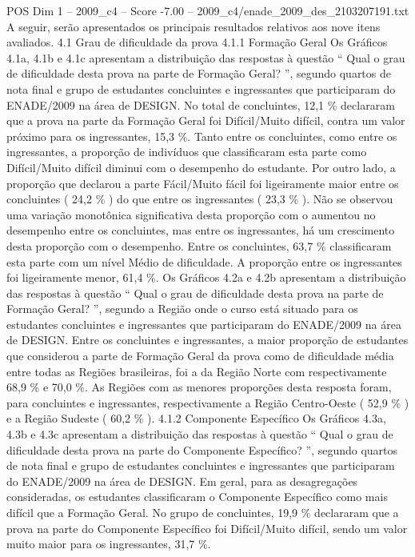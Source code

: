 \begin{textsample}{POS Dim 1 – 2009\_c4 – Score -7.00 – 2009\_c4/enade\_2009\_des\_2103207191.txt}
A seguir, serão apresentados os principais resultados relativos aos nove itens avaliados. 4.1 Grau de dificuldade da prova 4.1.1 Formação Geral Os Gráficos 4.1a, 4.1b e 4.1c apresentam a distribuição das respostas à questão “ Qual o grau de dificuldade desta prova na parte de Formação Geral? ”, segundo quartos de nota final e grupo de estudantes concluintes e ingressantes que participaram do ENADE/2009 na área de DESIGN.
No total de concluintes, 12,1 \% declararam que a prova na parte da Formação Geral foi Difícil/Muito difícil, contra um valor próximo para os ingressantes, 15,3 \%.
Tanto entre os concluintes, como entre os ingressantes, a proporção de indivíduos que classificaram esta parte como Difícil/Muito difícil diminui com o desempenho do estudante.
Por outro lado, a proporção que declarou a parte Fácil/Muito fácil foi ligeiramente maior entre os concluintes ( 24,2 \% ) do que entre os ingressantes ( 23,3 \% ).
Não se observou uma variação monotônica significativa desta proporção com o aumentou no desempenho entre os concluintes, mas entre os ingressantes, há um crescimento desta proporção com o desempenho.
Entre os concluintes, 63,7 \% classificaram esta parte com um nível Médio de dificuldade.
A proporção entre os ingressantes foi ligeiramente menor, 61,4 \%.
Os Gráficos 4.2a e 4.2b apresentam a distribuição das respostas à questão “ Qual o grau de dificuldade desta prova na parte de Formação Geral? ”, segundo a Região onde o curso está situado para os estudantes concluintes e ingressantes que participaram do ENADE/2009 na área de DESIGN.
Entre os concluintes e ingressantes, a maior proporção de estudantes que considerou a parte de Formação Geral da prova como de dificuldade média entre todas as Regiões brasileiras, foi a da Região Norte com respectivamente 68,9 \% e 70,0 \%.
As Regiões com as menores proporções desta resposta foram, para concluintes e ingressantes, respectivamente a Região Centro-Oeste ( 52,9 \% ) e a Região Sudeste ( 60,2 \% ). 4.1.2 Componente Específico Os Gráficos 4.3a, 4.3b e 4.3c apresentam a distribuição das respostas à questão “ Qual o grau de dificuldade desta prova na parte do Componente Específico? ”, segundo quartos de nota final e grupo de estudantes concluintes e ingressantes que participaram do ENADE/2009 na área de DESIGN.
Em geral, para as desagregações consideradas, os estudantes classificaram o Componente Específico como mais difícil que a Formação Geral.
No grupo de concluintes, 19,9 \% declararam que a prova na parte do Componente Específico foi Difícil/Muito difícil, sendo um valor muito maior para os ingressantes, 31,7 \%.

\end{textsample}
